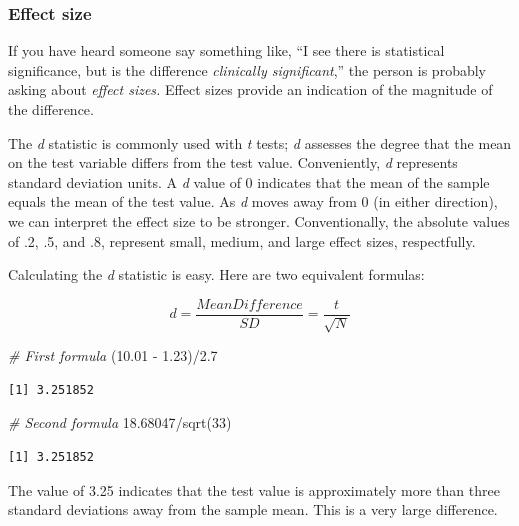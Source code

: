 \documentclass[
  11pt,
]{book}
\newenvironment{Shaded}{\begin{snugshade}}{\end{snugshade}}
\newcommand{\CommentTok}[1]{\textcolor[rgb]{0.56,0.35,0.01}{\textit{#1}}}
\newcommand{\DecValTok}[1]{\textcolor[rgb]{0.00,0.00,0.81}{#1}}
\newcommand{\FloatTok}[1]{\textcolor[rgb]{0.00,0.00,0.81}{#1}}
\newcommand{\FunctionTok}[1]{\textcolor[rgb]{0.00,0.00,0.00}{#1}}
\newcommand{\NormalTok}[1]{#1}
\newcommand{\SpecialCharTok}[1]{\textcolor[rgb]{0.00,0.00,0.00}{#1}}
\begin{document}
\hypertarget{effect-size}{%
\subsubsection{Effect size}\label{effect-size}}

If you have heard someone say something like, ``I see there is statistical significance, but is the difference \emph{clinically significant},'' the person is probably asking about \emph{effect sizes.} Effect sizes provide an indication of the magnitude of the difference.

The \emph{d} statistic is commonly used with \emph{t} tests; \emph{d} assesses the degree that the mean on the test variable differs from the test value. Conveniently, \emph{d} represents standard deviation units. A \emph{d} value of 0 indicates that the mean of the sample equals the mean of the test value. As \emph{d} moves away from 0 (in either direction), we can interpret the effect size to be stronger. Conventionally, the absolute values of .2, .5, and .8, represent small, medium, and large effect sizes, respectfully.

Calculating the \emph{d} statistic is easy. Here are two equivalent formulas:

\[d = \frac{Mean Difference}{SD}=\frac{t}{\sqrt{N}}\]

\begin{Shaded}
\begin{Highlighting}[]
\CommentTok{\# First formula}
\NormalTok{(}\FloatTok{10.01} \SpecialCharTok{{-}} \FloatTok{1.23}\NormalTok{)}\SpecialCharTok{/}\FloatTok{2.7}
\end{Highlighting}
\end{Shaded}

\begin{verbatim}
[1] 3.251852
\end{verbatim}

\begin{Shaded}
\begin{Highlighting}[]
\CommentTok{\# Second formula}
\FloatTok{18.68047}\SpecialCharTok{/}\FunctionTok{sqrt}\NormalTok{(}\DecValTok{33}\NormalTok{)}
\end{Highlighting}
\end{Shaded}

\begin{verbatim}
[1] 3.251852
\end{verbatim}

The value of 3.25 indicates that the test value is approximately more than three standard deviations away from the sample mean. This is a very large difference.
\end{document}
